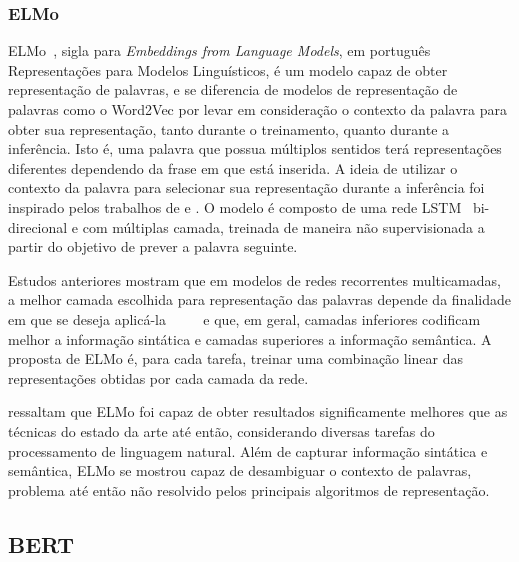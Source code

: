 \subsubsection{ELMo}

ELMo~\cite{peters18}, sigla para \textit{Embeddings from Language Models}, em
português Representações para Modelos Linguísticos, é um modelo capaz de obter
representação de palavras, e se diferencia de modelos de representação de
palavras como o Word2Vec por levar em consideração o contexto da palavra para
obter sua representação, tanto durante o treinamento, quanto durante a
inferência.
Isto é, uma palavra que possua múltiplos sentidos terá representações diferentes
dependendo da frase em que está inserida.
A ideia de utilizar o contexto da palavra para selecionar sua representação
durante a inferência foi inspirado pelos trabalhos de \citet{peters17} e
\citet{mccann17}.
O modelo é composto de uma rede LSTM~\cite{hochreiter97} bi-direcional e com
múltiplas camada, treinada de maneira não supervisionada a partir do objetivo de
prever a palavra seguinte.


Estudos anteriores mostram que em modelos de redes recorrentes multicamadas,
a melhor camada escolhida para representação das palavras depende da finalidade
em que se deseja aplicá-la
~\cite{hashimoto16}~\cite{sogaard16}~\cite{belinkov17}~\cite{melamud16} e que,
em geral, camadas inferiores codificam melhor a informação sintática e camadas
superiores a informação semântica.
A proposta de ELMo é, para cada tarefa, treinar uma combinação linear das
representações obtidas por cada camada da rede.

\citet{peters18} ressaltam que ELMo foi capaz de obter resultados significamente
melhores que as técnicas do estado da arte até então, considerando diversas tarefas
do processamento de linguagem natural.
Além de capturar informação sintática e semântica, ELMo se mostrou capaz de
desambiguar o contexto de palavras, problema até então não resolvido pelos
principais algoritmos de representação.

\subsection{BERT}

